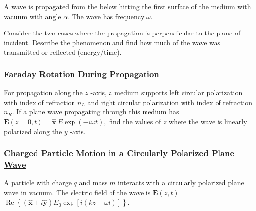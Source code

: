 A wave is propagated from the below hitting the first surface of the medium with vacuum with angle $\alpha .$ The wave has frequency $\omega$.

Consider the two cases where the propagation is perpendicular to the plane of incident. Describe the phenomenon and find how much of the wave was transmitted or reflected (energy/time).

\subsubsection{\hyperref[Faraday Rotation During Propagation]{Faraday Rotation During Propagation}}

For propagation along the $z$ -axis, a medium supports left circular polarization with index of refraction $n_{L}$ and right circular polarization with index of refraction $n_{R} .$ If a plane wave propagating through this medium has $\mathbf{E}(z=0, t)=\hat{\mathbf{x}}\: E \exp (-i \omega t),$ find the values of $z$ where the wave is linearly polarized along the $y$ -axis.

\subsubsection{\hyperref[Charged Particle Motion in a Circular Polarized wave]{Charged Particle Motion in a Circularly Polarized Plane Wave}}

A particle with charge $q$ and mass $m$ interacts with a circularly polarized plane wave in vacuum. The electric field of the wave is $\mathbf{E}(z, t)=$ $\operatorname{Re}\left\{(\hat{\mathbf{x}}+i \hat{\mathbf{y}}) E_{0} \exp [i(k z-\omega t)]\right\}$.

